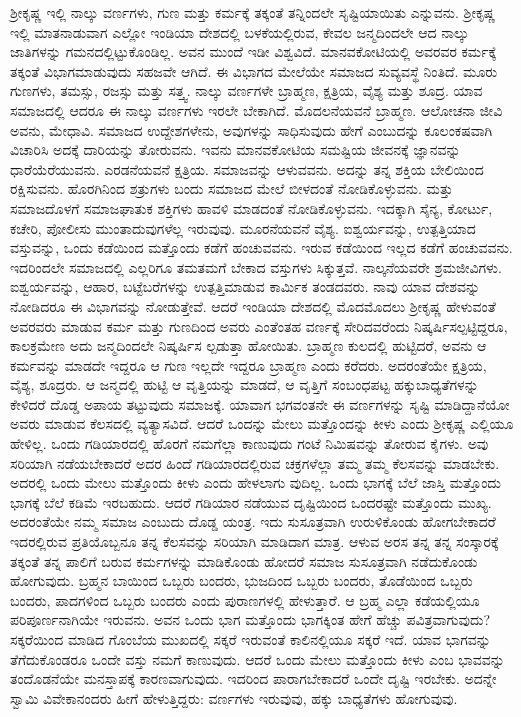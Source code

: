 ಶ‍್ರೀಕೃಷ್ಣ ಇಲ್ಲಿ ನಾಲ್ಕು ವರ್ಣಗಳು, ಗುಣ ಮತ್ತು ಕರ್ಮಕ್ಕೆ ತಕ್ಕಂತೆ ತನ್ನಿಂದಲೇ ಸೃಷ್ಟಿಯಾಯಿತು ಎನ್ನುವನು. ಶ‍್ರೀಕೃಷ್ಣ ಇಲ್ಲಿ ಮಾತನಾಡುವಾಗ ಎಲ್ಲೋ ಇಂಡಿಯಾ ದೇಶದಲ್ಲಿ ಬಳಕೆಯಲ್ಲಿರುವ, ಕೇವಲ ಜನ್ಮದಿಂದಲೇ ಆದ ನಾಲ್ಕು ಜಾತಿಗಳನ್ನು ಗಮನದಲ್ಲಿಟ್ಟುಕೊಂಡಿಲ್ಲ. ಅವನ ಮುಂದೆ ಇಡೀ ವಿಶ್ವವಿದೆ. ಮಾನವಕೋಟಿಯಲ್ಲಿ ಅವರವರ ಕರ್ಮಕ್ಕೆ ತಕ್ಕಂತೆ ವಿಭಾಗಮಾಡುವುದು ಸಹಜವೇ ಆಗಿದೆ. ಈ ವಿಭಾಗದ ಮೇಲೆಯೇ ಸಮಾಜದ ಸುವ್ಯವಸ್ಥೆ ನಿಂತಿದೆ. ಮೂರು ಗುಣಗಳು, ತಮಸ್ಸು, ರಜಸ್ಸು ಮತ್ತು ಸತ್ತ್ವ. ನಾಲ್ಕು ವರ್ಣಗಳೇ ಬ್ರಾಹ್ಮಣ, ಕ್ಷತ್ರಿಯ, ವೈಶ್ಯ ಮತ್ತು ಶೂದ್ರ. ಯಾವ ಸಮಾಜದಲ್ಲಿ ಆದರೂ ಈ ನಾಲ್ಕು ವರ್ಣಗಳು ಇರಲೇ ಬೇಕಾಗಿದೆ. ಮೊದಲನೆಯವನೆ ಬ್ರಾಹ್ಮಣ. ಆಲೋಚನಾ ಜೀವಿ ಅವನು, ಮೇಧಾವಿ. ಸಮಾಜದ ಉದ್ದೇಶಗಳೇನು, ಅವುಗಳನ್ನು ಸಾಧಿಸುವುದು ಹೇಗೆ ಎಂಬುದನ್ನು ಕೂಲಂಕಷವಾಗಿ ವಿಚಾರಿಸಿ ಅದಕ್ಕೆ ದಾರಿಯನ್ನು ತೋರುವನು. ಇವನು ಮಾನವಕೋಟಿಯ ಸಮಷ್ಟಿಯ ಜೀವನಕ್ಕೆ ಜ್ಞಾನವನ್ನು ಧಾರೆಯೆರೆಯುವನು. ಎರಡನೆಯವನೆ ಕ್ಷತ್ರಿಯ. ಸಮಾಜವನ್ನು ಆಳುವವನು. ಅದನ್ನು ತನ್ನ ಶಕ್ತಿಯ ಬೇಲಿಯಿಂದ ರಕ್ಷಿಸುವನು. ಹೊರಗಿನಿಂದ ಶತ್ರುಗಳು ಬಂದು ಸಮಾಜದ ಮೇಲೆ ಬೀಳದಂತೆ ನೋಡಿಕೊಳ್ಳುವನು. ಮತ್ತು ಸಮಾಜದೊಳಗೆ ಸಮಾಜಘಾತುಕ ಶಕ್ತಿಗಳು ಹಾವಳಿ ಮಾಡದಂತೆ ನೋಡಿಕೊಳ್ಳುವನು. ಇದಕ್ಕಾಗಿ ಸೈನ್ಯ, ಕೋರ್ಟು, ಕಚೇರಿ, ಪೋಲೀಸು ಮುಂತಾದುವುಗಳೆಲ್ಲ ಇರುವುವು. ಮೂರನೆಯವನೆ ವೈಶ್ಯ. ಐಶ್ವರ್ಯವನ್ನು, ಉತ್ಪತ್ತಿಯಾದ ವಸ್ತುವನ್ನು, ಒಂದು ಕಡೆಯಿಂದ ಮತ್ತೊಂದು ಕಡೆಗೆ ಹಂಚುವವನು. ಇರುವ ಕಡೆಯಿಂದ ಇಲ್ಲದ ಕಡೆಗೆ ಹಂಚುವವನು. ಇದರಿಂದಲೇ ಸಮಾಜದಲ್ಲಿ ಎಲ್ಲರಿಗೂ ತಮತಮಗೆ ಬೇಕಾದ ವಸ್ತುಗಳು ಸಿಕ್ಕುತ್ತವೆ. ನಾಲ್ಕನೆಯವರೇ ಶ್ರಮಜೀವಿಗಳು. ಐಶ್ವರ್ಯವನ್ನು, ಆಹಾರ, ಬಟ್ಟೆಬರೆಗಳನ್ನು ಉತ್ಪತ್ತಿಮಾಡುವ ಕಾರ್ಮಿಕ ತಂಡದವರು. ನಾವು ಯಾವ ದೇಶವನ್ನು ನೋಡಿದರೂ ಈ ವಿಭಾಗವನ್ನು ನೋಡುತ್ತೇವೆ. ಆದರೆ ಇಂಡಿಯಾ ದೇಶದಲ್ಲಿ ಮೊದಮೊದಲು ಶ‍್ರೀಕೃಷ್ಣ ಹೇಳುವಂತೆ ಅವರವರು ಮಾಡುವ ಕರ್ಮ ಮತ್ತು ಗುಣದಿಂದ ಅವರು ಎಂತೆಂತಹ ವರ್ಣಕ್ಕೆ ಸೇರಿದವರೆಂದು ನಿಷ್ಕರ್ಷಿಸಲ್ಪಟ್ಟಿದ್ದರೂ, ಕಾಲಕ್ರಮೇಣ ಅದು ಜನ್ಮದಿಂದಲೇ ನಿಷ್ಕರ್ಷಿಸ ಲ್ಪಡುತ್ತಾ ಹೋಯಿತು. ಬ್ರಾಹ್ಮಣ ಕುಲದಲ್ಲಿ ಹುಟ್ಟಿದರೆ, ಅವನು ಆ ಕರ್ಮವನ್ನು ಮಾಡದೇ ಇದ್ದರೂ ಆ ಗುಣ ಇಲ್ಲದೇ ಇದ್ದರೂ ಬ್ರಾಹ್ಮಣ ಎಂದು ಕರೆದರು. ಅದರಂತೆಯೇ ಕ್ಷತ್ರಿಯ, ವೈಶ್ಯ, ಶೂದ್ರರು. ಆ ಜನ್ಮದಲ್ಲಿ ಹುಟ್ಟಿ ಆ ವೃತ್ತಿಯನ್ನು ಮಾಡದೆ, ಆ ವೃತ್ತಿಗೆ ಸಂಬಂಧಪಟ್ಟ ಹಕ್ಕುಬಾಧ್ಯತೆಗಳನ್ನು ಕೇಳಿದರೆ ದೊಡ್ಡ ಅಪಾಯ ತಟ್ಟುವುದು ಸಮಾಜಕ್ಕೆ. ಯಾವಾಗ ಭಗವಂತನೇ ಈ ವರ್ಣಗಳನ್ನು ಸೃಷ್ಟಿ ಮಾಡಿದ್ದಾನೆಯೋ ಅವರು ಮಾಡುವ ಕೆಲಸದಲ್ಲಿ ವ್ಯತ್ಯಾಸವಿದೆ. ಆದರೆ ಒಂದನ್ನು ಮೇಲು ಮತ್ತೊಂದನ್ನು ಕೀಳು ಎಂದು ಶ‍್ರೀಕೃಷ್ಣ ಎಲ್ಲಿಯೂ ಹೇಳಿಲ್ಲ. ಒಂದು ಗಡಿಯಾರದಲ್ಲಿ ಹೊರಗೆ ನಮಗೆಲ್ಲಾ ಕಾಣುವುದು ಗಂಟೆ ನಿಮಿಷವನ್ನು ತೋರುವ ಕೈಗಳು. ಅವು ಸರಿಯಾಗಿ ನಡೆಯಬೇಕಾದರೆ ಅದರ ಹಿಂದೆ ಗಡಿಯಾರದಲ್ಲಿರುವ ಚಕ್ರಗಳೆಲ್ಲಾ ತಮ್ಮ ತಮ್ಮ ಕೆಲಸವನ್ನು ಮಾಡಬೇಕು. ಅದರಲ್ಲಿ ಒಂದು ಮೇಲು ಮತ್ತೊಂದು ಕೀಳು ಎಂದು ಹೇಳಲಾಗು ವುದಿಲ್ಲ. ಒಂದು ಭಾಗಕ್ಕೆ ಬೆಲೆ ಜಾಸ್ತಿ ಮತ್ತೊಂದು ಭಾಗಕ್ಕೆ ಬೆಲೆ ಕಡಿಮೆ ಇರಬಹುದು. ಆದರೆ ಗಡಿಯಾರ ನಡೆಯುವ ದೃಷ್ಟಿಯಿಂದ ಒಂದರಷ್ಟೇ ಮತ್ತೊಂದು ಮುಖ್ಯ. ಅದರಂತೆಯೇ ನಮ್ಮ ಸಮಾಜ ಎಂಬುದು ದೊಡ್ಡ ಯಂತ್ರ. ಇದು ಸುಸೂತ್ರವಾಗಿ ಉರುಳಿಕೊಂಡು ಹೋಗಬೇಕಾದರೆ ಇದರಲ್ಲಿರುವ ಪ್ರತಿಯೊಬ್ಬನೂ ತನ್ನ ಕೆಲಸವನ್ನು ಸರಿಯಾಗಿ ಮಾಡಿದಾಗ ಮಾತ್ರ. ಆಳುವ ಅರಸ ತನ್ನ ತನ್ನ ಸಂಸ್ಕಾರಕ್ಕೆ ತಕ್ಕಂತೆ ತನ್ನ ಪಾಲಿಗೆ ಬರುವ ಕರ್ಮಗಳನ್ನು ಮಾಡಿಕೊಂಡು ಹೋದರೆ ಸಮಾಜ ಸುಸೂತ್ರವಾಗಿ ನಡೆದುಕೊಂಡು ಹೋಗುವುದು. ಬ್ರಹ್ಮನ ಬಾಯಿಂದ ಒಬ್ಬರು ಬಂದರು, ಭುಜದಿಂದ ಒಬ್ಬರು ಬಂದರು, ತೊಡೆಯಿಂದ ಒಬ್ಬರು ಬಂದರು, ಪಾದಗಳಿಂದ ಒಬ್ಬರು ಬಂದರು ಎಂದು ಪುರಾಣಗಳಲ್ಲಿ ಹೇಳುತ್ತಾರೆ. ಆ ಬ್ರಹ್ಮ ಎಲ್ಲಾ ಕಡೆಯಲ್ಲಿಯೂ ಪರಿಪೂರ್ಣನಾಗಿಯೇ ಇರುವನು. ಅವನ ಒಂದು ಭಾಗ ಮತ್ತೊಂದು ಭಾಗಕ್ಕಿಂತ ಹೇಗೆ ಹೆಚ್ಚು ಪವಿತ್ರವಾಗುವುದು? ಸಕ್ಕರೆಯಿಂದ ಮಾಡಿದ ಗೊಂಬೆಯ ಮುಖದಲ್ಲಿ ಸಕ್ಕರೆ ಇರುವಂತೆ ಕಾಲಿನಲ್ಲಿಯೂ ಸಕ್ಕರೆ ಇದೆ. ಯಾವ ಭಾಗವನ್ನು ತೆಗೆದುಕೊಂಡರೂ ಒಂದೇ ವಸ್ತು ನಮಗೆ ಕಾಣುವುದು. ಆದರೆ ಒಂದು ಮೇಲು ಮತ್ತೊಂದು ಕೀಳು ಎಂಬ ಭಾವವನ್ನು ತಂದೊಡನೆಯೇ ಮನಸ್ತಾಪಕ್ಕೆ ಕಾರಣವಾಗುವುದು. ಇದರಿಂದ ಪಾರಾಗಬೇಕಾದರೆ ಒಂದೇ ದೃಷ್ಟಿ ಇರಬೇಕು. ಅದನ್ನೇ ಸ್ವಾಮಿ ವಿವೇಕಾನಂದರು ಹೀಗೆ ಹೇಳುತ್ತಿದ್ದರು: ವರ್ಣಗಳು ಇರುವುವು, ಹಕ್ಕು ಬಾಧ್ಯತೆಗಳು ಹೋಗುವುವು.

